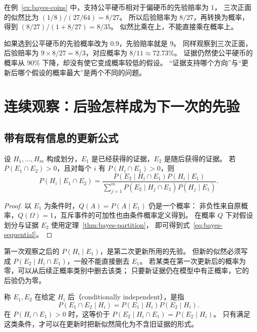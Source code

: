 \documentclass[UTF8]{ctexart}
\begin{document}
在例~\ref{ex:bayes-coins} 中，支持公平硬币相对于偏硬币的先验赔率为 $1$，
三次正面的似然比为 $(1/8)/(27/64)=8/27$。
所以后验赔率为 $8/27$，再转换为概率，得到 $(8/27)/(1+8/27)=8/35$。
似然比乘在上，不能直接乘在概率上。

如果选到公平硬币的先验概率改为 $0.9$，先验赔率就是 $9$。
同样观察到三次正面，后验赔率为 $9\times8/27=8/3$，对应概率为 $8/11\approx72.73\%$。
证据仍然使公平硬币的概率从 $90\%$ 下降，却没有使它变成概率较低的假设。
“证据支持哪个方向”与“更新后哪个假设的概率最大”是两个不同的问题。

\section{连续观察：后验怎样成为下一次的先验}
\label{sec:bayes-sequential}

\subsection{带有既有信息的更新公式}

\begin{proposition}[保留既有条件的贝叶斯更新]
\label{prop:bayes-sequential}
设 $H_1,\ldots,H_m$ 构成划分，$E_1$ 是已经获得的证据，$E_2$ 是随后获得的证据。
若 $P(E_1\cap E_2)>0$，且对每个 $i$ 有 $P(H_i\cap E_1)>0$，则
\begin{equation}
  P(H_i\mid E_1\cap E_2)
  =\frac{P(E_2\mid H_i\cap E_1)P(H_i\mid E_1)}
  {\displaystyle\sum_{j=1}^{m}P(E_2\mid H_j\cap E_1)P(H_j\mid E_1)}.
  \label{eq:bayes-sequential}
\end{equation}
\end{proposition}
\begin{proof}
以 $E_1$ 为条件时，$Q(A)=P(A\mid E_1)$ 仍是一个概率：
非负性来自原概率，$Q(\Omega)=1$，互斥事件的可加性也由条件概率定义得到。
在概率 $Q$ 下对假设划分与证据 $E_2$ 使用定理~\ref{thm:bayes-partition}，
即可得到式~\eqref{eq:bayes-sequential}。
\end{proof}

第一次观察之后的 $P(H_i\mid E_1)$，是第二次更新所用的先验。
但新的似然必须写成 $P(E_2\mid H_i\cap E_1)$，一般不能直接删去 $E_1$。
若某类在第一次更新后的概率为零，可以从后续正概率类别中删去该类；
只要新证据仍在模型中有正概率，它的后验仍为零。

称 $E_1,E_2$ 在给定 $H_i$ 后（conditionally independent），是指
\[
  P(E_1\cap E_2\mid H_i)
  =P(E_1\mid H_i)P(E_2\mid H_i).
\]
在 $P(H_i\cap E_1)>0$ 时，这等价于
$P(E_2\mid H_i\cap E_1)=P(E_2\mid H_i)$。
只有满足这类条件，才可以在更新时把新似然简化为不含旧证据的形式。
\end{document}
